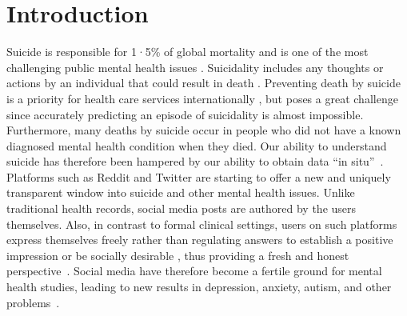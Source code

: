 \vspace{-8mm}
\section{Introduction}
Suicide is responsible for 1·5\% of global mortality and is one of the most challenging public mental health 
issues \cite{oconnor_psychology_2014}.
Suicidality includes any thoughts or actions by an individual that could %
result in death \cite{turecki_suicide_2016}. 
Preventing death by suicide is a priority for health care services internationally \cite{zalsman_suicide_2016}, but poses a great challenge since accurately predicting an episode of suicidality is almost impossible\cite{mchugh2019,velupillai_risk_2019}. Furthermore, many deaths by suicide occur in people who did not have a known diagnosed mental health condition when they died\cite{stone_vital_2018}. Our ability to understand suicide has therefore been hampered by our ability to obtain data ``in situ''~\cite{nock2019}.
Platforms such as Reddit and Twitter are starting to offer a new and uniquely transparent window into suicide and other mental health issues. Unlike traditional health records, social media posts are authored by the users themselves. Also, in contrast to formal clinical settings, users on such platforms express themselves freely rather than regulating answers to establish a positive impression or be socially desirable \cite{van_de_mortel_role_2008}, thus providing a fresh and honest perspective~\cite{gkotsis2017characterisation}. Social media have therefore become a fertile ground for mental health studies, leading to new results in %
depression, anxiety, autism, and other problems~\cite{de2014mental,park2018examining,shen2017detecting,park2017longitudinal,DeChoudhury2016,DeChoudhury2014}.
 
